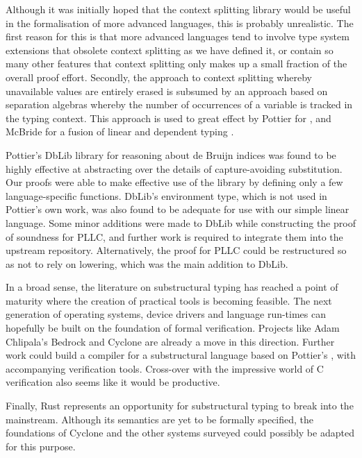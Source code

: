 \documentclass[]{unswthesis}
\newcommand{\SSPHS}{\text{SSPHS }}
\begin{document}
Although it was initially hoped that the context splitting library would be useful in the formalisation of more advanced languages, this is probably unrealistic. The first reason for this is that more advanced languages tend to involve type system extensions that obsolete context splitting as we have defined it, or contain so many other features that context splitting only makes up a small fraction of the overall proof effort. Secondly, the approach to context splitting whereby unavailable values are entirely erased is subsumed by an approach based on separation algebras whereby the number of occurrences of a variable is tracked in the typing context. This approach is used to great effect by Pottier for \SSPHS \cite{pottier13}, and McBride for a fusion of linear and dependent typing \cite{mcbride16}.

Pottier's DbLib library for reasoning about de Bruijn indices was found to be highly effective at abstracting over the details of capture-avoiding substitution. Our proofs were able to make effective use of the library by defining only a few language-specific functions. DbLib's environment type, which is not used in Pottier's own work, was also found to be adequate for use with our simple linear language. Some minor additions were made to DbLib while constructing the proof of soundness for PLLC, and further work is required to integrate them into the upstream repository. Alternatively, the proof for PLLC could be restructured so as not to rely on lowering, which was the main addition to DbLib.

In a broad sense, the literature on substructural typing has reached a point of maturity where the creation of practical tools is becoming feasible. The next generation of operating systems, device drivers and language run-times can hopefully be built on the foundation of formal verification. Projects like Adam Chlipala's Bedrock \cite{chlipala11} and Cyclone \cite{grossman05} are already a move in this direction. Further work could build a compiler for a substructural language based on Pottier's \SSPHS \cite{pottier13}, with accompanying verification tools. Cross-over with the impressive world of C verification also seems like it would be productive.

Finally, Rust represents an opportunity for substructural typing to break into the mainstream. Although its semantics are yet to be formally specified, the foundations of Cyclone and the other systems surveyed could possibly be adapted for this purpose.

\backmatter
\pagebreak


\end{document}
